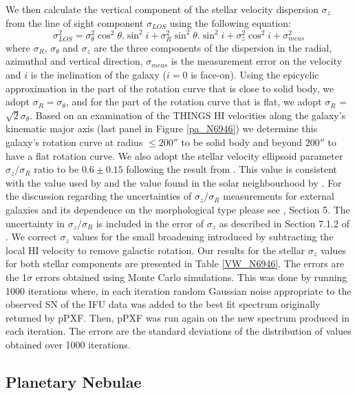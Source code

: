 \documentclass[fleqn,usenatbib]{mnras}
\begin{document}
We then calculate the vertical component of the stellar velocity dispersion $\sigma_z$ from the line of sight component $\sigma_{LOS}$ using the following equation:
\begin{equation}
\sigma_{LOS}^2 = \sigma_\theta^2 \cos^2 \theta . \sin^2 i + \sigma_R^2 \sin^2\theta .\sin^2 i + \sigma_z^2 \cos^2 i + \sigma_{meas}^2
\end{equation}
where $\sigma_R$, $\sigma_\theta$ and $\sigma_z$ are the three components of the dispersion in the radial, azimuthal and vertical direction, $\sigma_{meas}$ is the measurement error on the velocity and $i$ is the inclination of the galaxy ($i = 0$ is face-on).  %
Using the epicyclic approximation in the part of the rotation curve that is close to solid body, we adopt $\sigma_R = \sigma_\theta$,
and for the part of the rotation curve that is flat, we adopt $\sigma_R$ = $\sqrt{2}\sigma_\theta$. Based on an examination of the THINGS HI velocities along the galaxy's kinematic major axis (last panel in Figure \ref{pa_N6946}) we determine this galaxy's rotation curve at radius $\leq 200''$ to be solid body and beyond $200''$ to have a flat rotation curve. We also adopt the stellar velocity ellipsoid parameter $\sigma_z/\sigma_R$ ratio to be $0.6 \pm 0.15$ following the result from \citet{Shapiro:03}. This value is consistent with the value used by \citet{Bershady:10b} and the value found in the solar neighbourhood by \citet{Aniyan16}. For the discussion regarding the uncertainties of $\sigma_z/\sigma_R$ measurements for external galaxies and its dependence on the morphological type please see , Section 5. The uncertainty in $\sigma_z/\sigma_R$ is included in the error of $\sigma_z$ as described in Section 7.1.2 of . We correct $\sigma_z$ values for the small broadening introduced by subtracting the local HI velocity to remove galactic rotation. Our results for the stellar $\sigma_z$ values for both stellar components are presented in Table \ref{VW_N6946}. The errors are the 1$\sigma$ errors obtained using Monte Carlo simulations. This was done by running 1000 iterations where, in each iteration random Gaussian noise appropriate to the observed SN of the IFU data was added to the best fit spectrum originally returned by pPXF. Then, pPXF was run again on the new spectrum produced in each iteration. The errors are the standard deviations of the distribution of values obtained over 1000 iterations.

\subsection{Planetary Nebulae}
\end{document}
